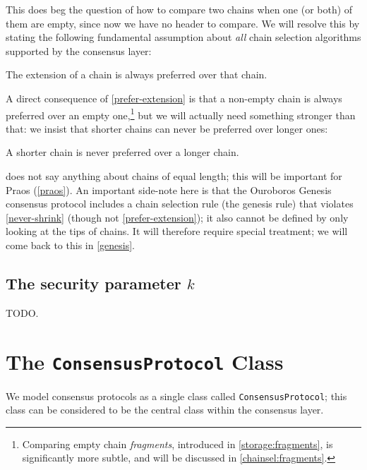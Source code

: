 This does beg the question of how to compare two chains when one (or both) of
them are empty, since now we have no header to compare. We will resolve this by
stating the following fundamental assumption about \emph{all} chain selection
algorithms supported by the consensus layer:

\begin{assumption}
\label{prefer-extension}
The extension of a chain is always preferred over that chain.
\end{assumption}

A direct consequence of \cref{prefer-extension} is that a non-empty chain is
always preferred over an empty one,\footnote{Comparing empty chain
\emph{fragments}, introduced in \cref{storage:fragments}, is significantly more
subtle, and will be discussed in \cref{chainsel:fragments}.} but we will
actually need something stronger than that: we insist that shorter chains can
never be preferred over longer ones:

\begin{assumption}
\label{never-shrink}
A shorter chain is never preferred over a longer chain.
\end{assumption}

 does not say anything about chains of equal length; this will
be important for Praos (\cref{praos}). An important side-note here is that
the Ouroboros Genesis consensus protocol includes a chain selection rule
(the genesis rule) that violates \cref{never-shrink} (though not \cref{prefer-extension}); it also cannot be defined by only looking at the tips of chains.
It will therefore require special treatment; we will come back to this in
\cref{genesis}.

\subsection{The security parameter $k$}
\label{consensus:overview:k}

TODO.

\section{The \lstinline!ConsensusProtocol! Class}
\label{consensus:class}

We model consensus protocols as a single class called
\lstinline!ConsensusProtocol!; this class can be considered to be the
central class within the consensus layer.

